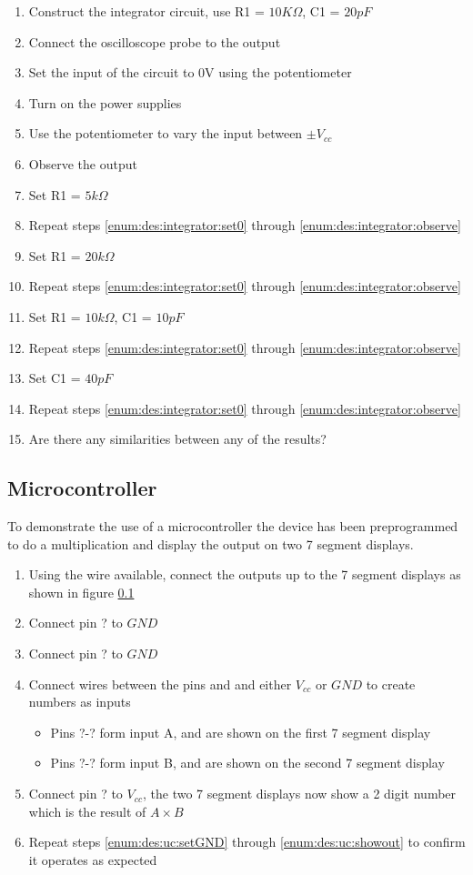 \begin{enumerate}
\item Construct the integrator circuit, use R1 = $10K\Omega$, C1 = $20pF$
\item Connect the oscilloscope probe to the output
\item \label{enum:des:integrator:set0} Set the input of the circuit to 0V using the potentiometer
\item Turn on the power supplies
\item Use the potentiometer to vary the input between $\pm V_{cc}$
\item \label{enum:des:integrator:observe} Observe the output
\item Set R1 = $5k\Omega$
\item Repeat steps \ref{enum:des:integrator:set0} through \ref{enum:des:integrator:observe}
\item Set R1 = $20k\Omega$
\item Repeat steps \ref{enum:des:integrator:set0} through \ref{enum:des:integrator:observe}
\item Set R1 = $10k\Omega$, C1 = $10pF$
\item Repeat steps \ref{enum:des:integrator:set0} through \ref{enum:des:integrator:observe}
\item Set C1 = $40pF$
\item Repeat steps \ref{enum:des:integrator:set0} through \ref{enum:des:integrator:observe}
\item Are there any similarities between any of the results?
\end{enumerate}

\subsection{Microcontroller}
To demonstrate the use of a microcontroller the device has been preprogrammed to do a multiplication and display the output on two 7 segment displays.

\begin{enumerate}
\item Using the wire available, connect the outputs up to the 7 segment displays as shown in figure \ref{}
\item Connect pin ? to $GND$
\item \label{enum:des:uc:setGND} Connect pin ? to $GND$
\item Connect wires between the pins and and either $V_{cc}$ or $GND$ to create numbers as inputs
\begin{itemize}
\item Pins ?-? form input A, and are shown on the first 7 segment display
\item Pins ?-? form input B, and are shown on the second 7 segment display
\end{itemize}
\item \label{enum:des:uc:showout} Connect pin ? to $V_{cc}$, the two 7 segment displays now show a 2 digit number which is the result of $A \times B$
\item Repeat steps \ref{enum:des:uc:setGND} through \ref{enum:des:uc:showout} to confirm it operates as expected
\end{enumerate}
